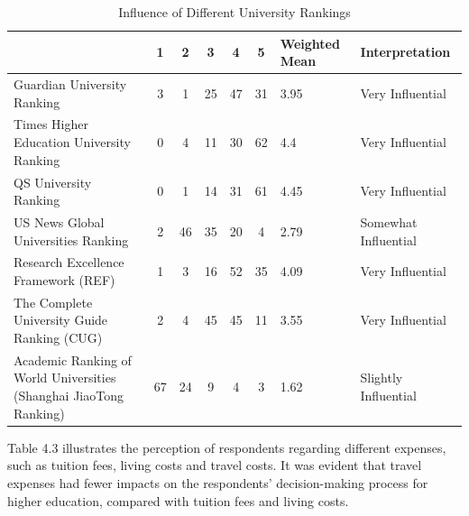 \begin{table}[H]
\centering
\caption{Influence of Different University Rankings
}
\label{my-label}
\begin{tabular}{|p{4cm}|c|c|c|c|c|p{2cm}|p{3cm}|}
\hline
                                                                   & \textbf{1} & \textbf{2} & \textbf{3} & \textbf{4} & \textbf{5} & \textbf{Weighted Mean} & \textbf{Interpretation} \\ \hline
Guardian University Ranking                                        & 3          & 1          & 25         & 47         & 31         & 3.95                   & Very Influential        \\ \hline
Times Higher Education University Ranking                          & 0          & 4          & 11         & 30         & 62         & 4.4                    & Very Influential        \\ \hline
QS University Ranking                                              & 0          & 1          & 14         & 31         & 61         & 4.45                   & Very Influential        \\ \hline
US News Global Universities Ranking                                & 2          & 46         & 35         & 20         & 4          & 2.79                   & Somewhat Influential    \\ \hline
Research Excellence Framework (REF)                                & 1          & 3          & 16         & 52         & 35         & 4.09                   & Very Influential        \\ \hline
The Complete University Guide Ranking (CUG)                        & 2          & 4          & 45         & 45         & 11         & 3.55                   & Very Influential        \\ \hline
Academic Ranking of World Universities (Shanghai JiaoTong Ranking) & 67         & 24         & 9          & 4          & 3          & 1.62                   & Slightly Influential    \\ \hline
\end{tabular}
\end{table}

Table 4.3 illustrates the perception of respondents regarding different expenses, such as tuition fees, living costs and travel costs. It was evident that travel expenses had fewer impacts on the respondents’ decision-making process for higher education, compared with tuition fees and living costs. 

